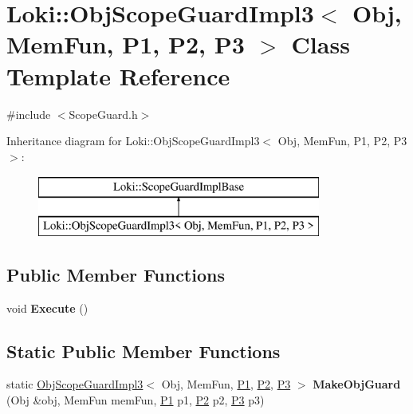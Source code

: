 \hypertarget{classLoki_1_1ObjScopeGuardImpl3}{}\section{Loki\+:\+:Obj\+Scope\+Guard\+Impl3$<$ Obj, Mem\+Fun, P1, P2, P3 $>$ Class Template Reference}
\label{classLoki_1_1ObjScopeGuardImpl3}


{\ttfamily \#include $<$Scope\+Guard.\+h$>$}

Inheritance diagram for Loki\+:\+:Obj\+Scope\+Guard\+Impl3$<$ Obj, Mem\+Fun, P1, P2, P3 $>$\+:\begin{figure}[H]
\begin{center}
\leavevmode
\includegraphics[height=2.000000cm]{classLoki_1_1ObjScopeGuardImpl3}
\end{center}
\end{figure}
\subsection*{Public Member Functions}
\begin{DoxyCompactItemize}
\item 
\hypertarget{classLoki_1_1ObjScopeGuardImpl3_a83843d3a1a6d7123a1122589f884929d}{}void {\bfseries Execute} ()\label{classLoki_1_1ObjScopeGuardImpl3_a83843d3a1a6d7123a1122589f884929d}

\end{DoxyCompactItemize}
\subsection*{Static Public Member Functions}
\begin{DoxyCompactItemize}
\item 
\hypertarget{classLoki_1_1ObjScopeGuardImpl3_a56d84beb5b0f53645b25d8e081e7330b}{}static \hyperlink{classLoki_1_1ObjScopeGuardImpl3}{Obj\+Scope\+Guard\+Impl3}$<$ Obj, Mem\+Fun, \hyperlink{structP1}{P1}, \hyperlink{structP2}{P2}, \hyperlink{structP3}{P3} $>$ {\bfseries Make\+Obj\+Guard} (Obj \&obj, Mem\+Fun mem\+Fun, \hyperlink{structP1}{P1} p1, \hyperlink{structP2}{P2} p2, \hyperlink{structP3}{P3} p3)\label{classLoki_1_1ObjScopeGuardImpl3_a56d84beb5b0f53645b25d8e081e7330b}

\end{DoxyCompactItemize}
